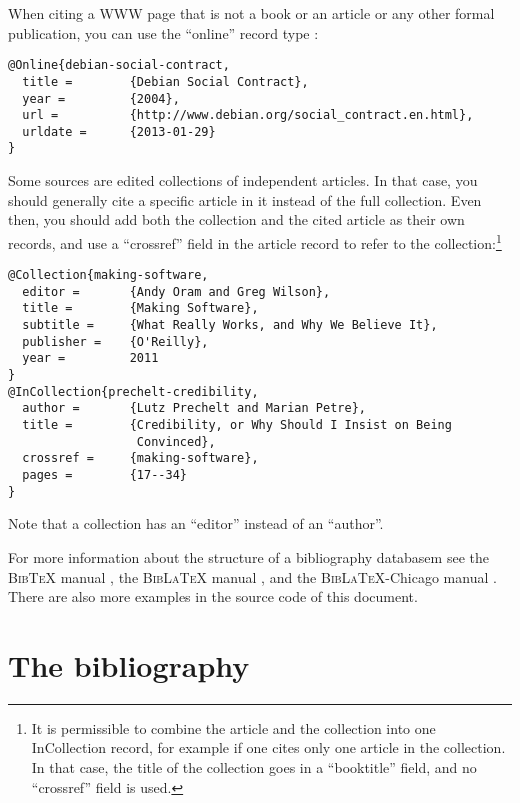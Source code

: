 \documentclass[utf8,english]{gradu3}
\begin{document}
When citing a WWW page that is not a book or an article or any other
formal publication, you can use the ``online'' record
type \parencite[eg.][]{debian-social-contract}:

\begingroup\footnotesize
\begin{verbatim}
@Online{debian-social-contract,
  title =        {Debian Social Contract},
  year =         {2004},
  url =          {http://www.debian.org/social_contract.en.html},
  urldate =      {2013-01-29}
}
\end{verbatim}
\endgroup

Some sources are edited collections of independent articles.  In that
case, you should generally cite a specific article in
it \parencite[eg.][]{prechelt-credibility} instead of the full
collection.  Even then, you should add both the collection and the
cited article as their own records, and use a ``crossref'' field in
the article record to refer to the collection:\footnote{It is
  permissible to combine the article and the collection into one
  InCollection record, for example if one cites only one article in
  the collection.  In that case, the title of the collection goes in a
  ``booktitle'' field, and no ``crossref'' field is used.}

\begingroup\footnotesize
\begin{verbatim}
@Collection{making-software,
  editor =       {Andy Oram and Greg Wilson},
  title =        {Making Software},
  subtitle =     {What Really Works, and Why We Believe It},
  publisher =    {O'Reilly},
  year =         2011
}
@InCollection{prechelt-credibility,
  author =       {Lutz Prechelt and Marian Petre},
  title =        {Credibility, or Why Should I Insist on Being
                  Convinced},
  crossref =     {making-software},
  pages =        {17--34}
}
\end{verbatim}
\endgroup

Note that a collection has an ``editor'' instead of an ``author''.

For more information about the structure of a bibliography databasem
see the \textsc{Bib\TeX} manual \parencite{bibtexing},
the \textsc{Bib\LaTeX} manual \parencite[Section~2]{biblatex-manual},
and the \textsc{Bib\LaTeX}-Chicago manual
\parencite[Sections 5.1--5.2]{biblatex-chicago-manual}.  There are
also more examples in the source code of this document.


\section{The bibliography}
\end{document}
